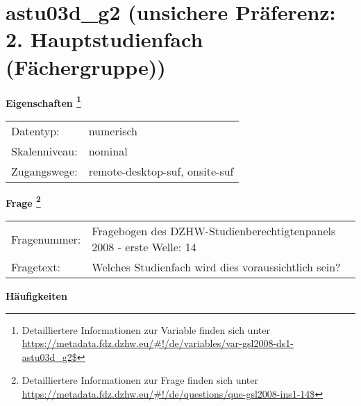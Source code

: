 
    \setcounter{footnote}{0}

    \vspace*{-1.8cm}
	\section{astu03d\_g2 (unsichere Präferenz: 2. Hauptstudienfach (Fächergruppe))}
	\label{section:astu03d_g2}



    \vspace*{0.5cm}
    \noindent\textbf{Eigenschaften
	\footnote{Detailliertere Informationen zur Variable finden sich unter
		\url{https://metadata.fdz.dzhw.eu/\#!/de/variables/var-gsl2008-ds1-astu03d_g2$}}}\\
	\begin{tabularx}{\hsize}{@{}lX}
	Datentyp: & numerisch \\
	Skalenniveau: & nominal \\
	Zugangswege: &
	  remote-desktop-suf, 
	  onsite-suf
 \\
    \end{tabularx}



				\vspace*{0.5cm}
                \noindent\textbf{Frage
	                \footnote{Detailliertere Informationen zur Frage finden sich unter
		              \url{https://metadata.fdz.dzhw.eu/\#!/de/questions/que-gsl2008-ins1-14$}}}\\
				\begin{tabularx}{\hsize}{@{}lX}
					Fragenummer: &
					  Fragebogen des DZHW-Studienberechtigtenpanels 2008 - erste Welle:
					  14
 \\
					Fragetext: & Welches Studienfach wird dies voraussichtlich sein? \\
				\end{tabularx}





        		\vspace*{0.5cm}
                \noindent\textbf{Häufigkeiten}

